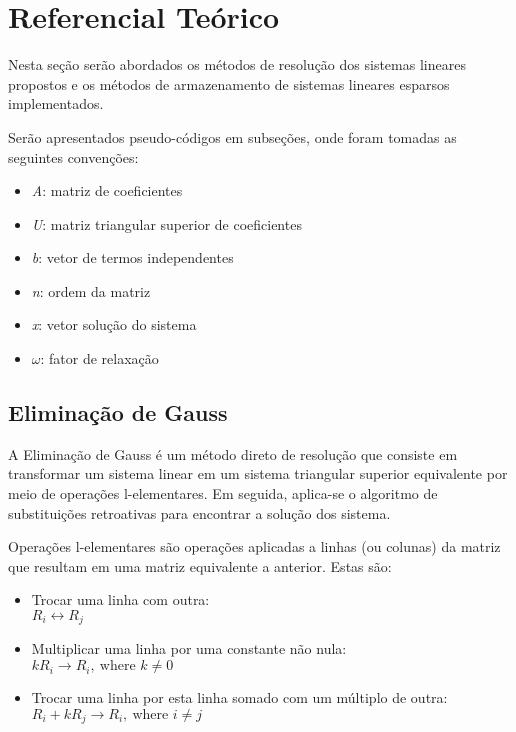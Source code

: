\documentclass[
	article,			%
	11pt,				%
	oneside,			%
	a4paper,			%
	english,			%
	brazil,				%
	sumario=tradicional
	]{abntex2}
\begin{document}
\section{Referencial Teórico}
Nesta seção serão abordados os métodos de resolução dos sistemas lineares propostos e os métodos de armazenamento de sistemas lineares esparsos implementados.

Serão apresentados pseudo-códigos em subseções, onde foram tomadas as seguintes convenções:
\begin{itemize}
  \item \textit{A}: matriz de coeficientes
  \item \textit{U}: matriz triangular superior de coeficientes
  \item \textit{b}: vetor de termos independentes
  \item \textit{n}: ordem da matriz
  \item \textit{x}: vetor solução do sistema
  \item \textit{$\omega$}: fator de relaxação
\end{itemize}

\subsection{Eliminação de Gauss}
A Eliminação de Gauss é um método direto de resolução que consiste em transformar um sistema linear em um sistema triangular superior equivalente por meio de operações l-elementares. Em seguida, aplica-se o algoritmo de substituições retroativas para encontrar a solução dos sistema.

Operações l-elementares são operações aplicadas a linhas (ou colunas) da matriz que resultam em uma matriz equivalente a anterior. Estas são:
\begin{itemize}
  \item Trocar uma linha com outra:\\ $ R_i \leftrightarrow R_j $
  \item Multiplicar uma linha por uma constante não nula:\\ $ kR_i \rightarrow R_i,\ \mbox{where } k \neq 0 $
  \item Trocar uma linha por esta linha somado com um múltiplo de outra:\\ $ R_i + kR_j \rightarrow R_i,\ \mbox{where } i \neq j $
\end{itemize}
\end{document}
